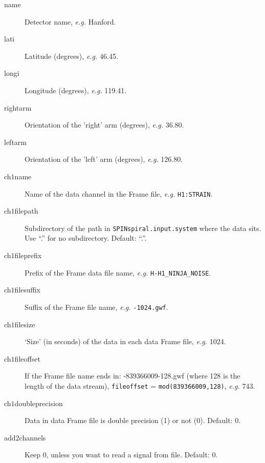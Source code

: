 \documentclass[10pt]{article}
\begin{document}
\begin{description}
\item[name] Detector name, \textit{e.g.} Hanford.
\item[lati] Latitude (degrees), \textit{e.g.} 46.45.
\item[longi] Longitude (degrees), \textit{e.g.} 119.41.
\item[rightarm] Orientation of the 'right' arm (degrees), \textit{e.g.} 36.80.
\item[leftarm] Orientation of the 'left' arm (degrees), \textit{e.g.} 126.80.
                                                                                                                                                                                                               
\item[ch$1$name] Name of the data channel in the Frame file, \textit{e.g.} \texttt{H1:STRAIN}.
\item[ch$1$filepath] Subdirectory of the path in \texttt{SPINspiral.input.system} where the data sits.  Use ``.'' for no subdirectory.  Default: ``.''.
\item[ch$1$fileprefix] Prefix of the Frame data file name, \textit{e.g.} \texttt{H-H1\_NINJA\_NOISE}.
\item[ch$1$filesuffix] Suffix of the Frame file name, \textit{e.g.} \texttt{-1024.gwf}.
\item[ch$1$filesize] `Size' (in seconds) of the data in each data Frame file, \textit{e.g.} 1024.
\item[ch$1$fileoffset] If the Frame file name ends in: -839366009-128.gwf (where 128 is the length of the data stream), \texttt{fileoffset} = \texttt{mod(839366009,128)}, \textit{e.g.} 743.
\item[ch$1$doubleprecision] Data in data Frame file is double precision (1) or not (0).  Default: 0.
\item[add2channels] Keep 0, unless you want to read a signal from file.  Default: 0.


\end{description}
\end{document}
